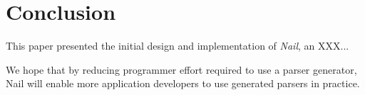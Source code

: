 \section{Conclusion}
\label{s:concl}

This paper presented the initial design and implementation of
\textit{Nail}, an XXX...

We hope that by reducing programmer effort required to use a parser
generator, Nail will enable more application developers to use generated
parsers in practice.

